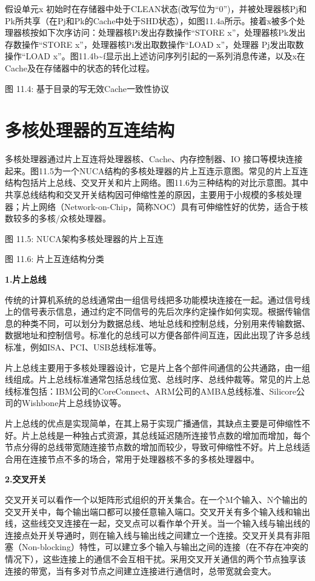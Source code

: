 \documentclass[]{ctexbook}
\begin{document}
假设单元x 初始时在存储器中处于CLEAN状态(改写位为``0'')，并被处理器核Pj和Pk所共享（在Pj和Pk的Cache中处于SHD状态），如图11.4a所示。接着x被多个处理器核按如下次序访问：处理器核Pi发出存数操作``STORE x''，处理器核Pk发出存数操作``STORE x''，处理器核Pi发出取数操作``LOAD x''，处理器 Pj发出取数操作``LOAD x''。图11.4b\textasciitilde f显示出上述访问序列引起的一系列消息传递，以及x在Cache及在存储器中的状态的转化过程。

图 11.4: 基于目录的写无效Cache一致性协议

\hypertarget{ux591aux6838ux5904ux7406ux5668ux7684ux4e92ux8fdeux7ed3ux6784}{%
\section{多核处理器的互连结构}\label{ux591aux6838ux5904ux7406ux5668ux7684ux4e92ux8fdeux7ed3ux6784}}

多核处理器通过片上互连将处理器核、Cache、内存控制器、IO 接口等模块连接起来。图11.5为一个NUCA结构的多核处理器的片上互连示意图。常见的片上互连结构包括片上总线、交叉开关和片上网络。图11.6为三种结构的对比示意图。其中共享总线结构和交叉开关结构因可伸缩性差的原因，主要用于小规模的多核处理器；片上网络（Network-on-Chip，简称NOC）具有可伸缩性好的优势，适合于核数较多的多核/众核处理器。

图 11.5: NUCA架构多核处理器的片上互连

图 11.6: 片上互连结构分类

\textbf{1.片上总线}

传统的计算机系统的总线通常由一组信号线把多功能模块连接在一起。通过信号线上的信号表示信息，通过约定不同信号的先后次序约定操作如何实现。根据传输信息的种类不同，可以划分为数据总线、地址总线和控制总线，分别用来传输数据、数据地址和控制信号。标准化的总线可以方便各部件间互连，因此出现了许多总线标准，例如ISA、PCI、USB总线标准等。

片上总线主要用于多核处理器设计，它是片上各个部件间通信的公共通路，由一组线组成。片上总线标准通常包括总线位宽、总线时序、总线仲裁等。常见的片上总线标准包括：IBM公司的CoreConnect、ARM公司的AMBA总线标准、Silicore公司的Wishbone片上总线协议等。

片上总线的优点是实现简单，在其上易于实现广播通信，其缺点主要是可伸缩性不好。片上总线是一种独占式资源，其总线延迟随所连接节点数的增加而增加，每个节点分得的总线带宽随连接节点数的增加而较少，导致可伸缩性不好。片上总线适合用在连接节点不多的场合，常用于处理器核不多的多核处理器中。

\textbf{2.交叉开关}

交叉开关可以看作一个以矩阵形式组织的开关集合。在一个M个输入、N个输出的交叉开关中，每个输出端口都可以接任意输入端口。交叉开关有多个输入线和输出线，这些线交叉连接在一起，交叉点可以看作单个开关。当一个输入线与输出线的连接点处开关导通时，则在输入线与输出线之间建立一个连接。交叉开关具有非阻塞（Non-blocking）特性，可以建立多个输入与输出之间的连接（在不存在冲突的情况下），这些连接上的通信不会互相干扰。采用交叉开关通信的两个节点独享该连接的带宽，当有多对节点之间建立连接进行通信时，总带宽就会变大。
\end{document}

